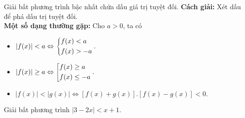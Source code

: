\begin{dang}{Giải bất phương trình bậc nhất chứa dấu giá trị tuyệt đối.}
	{\bf Cách giải:} Xét dấu để phá dấu trị tuyệt đối.\\
	{\bf Một số dạng thường gặp:} Cho $a>0$, ta có
	\begin{itemize}
		\item $\vert f(x) \vert < a \Leftrightarrow \left\{\begin{aligned}&f(x) < a\\&f(x) > -a\end{aligned}\right..$
		\item $\vert f(x) \vert \ge a \Leftrightarrow \left[\begin{aligned}&f(x) \ge a\\&f(x) \le -a\end{aligned}\right..$
		\item $\vert f(x) \vert < \vert g(x) \vert \Leftrightarrow \left[f(x)+g(x)\right].\left[f(x)-g(x)\right] <0.$
		
	\end{itemize}
	
\end{dang}

\begin{vd}%
	Giải bất phương trình $\vert 3-2x\vert < x+1$.
\end{vd}

